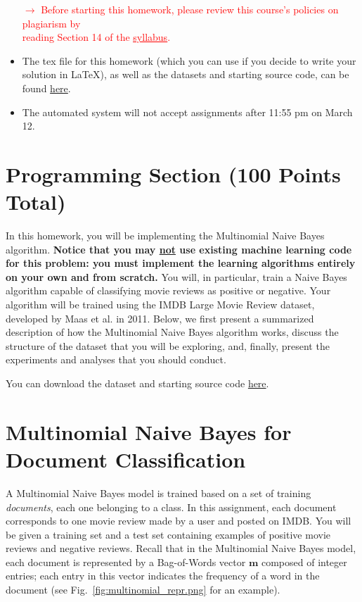 \documentclass[letterpaper]{article}
\begin{document}
\begin{itemize}
\begin{center}
    \textcolor{red}{$\rightarrow$ Before starting this homework, please review this course's policies on plagiarism by  \\reading Section 14 of the \href{https://people.cs.umass.edu/~bsilva/courses/CMPSCI_589/Spring2024/S24_589_Syllabus_v2.0.pdf\#page=5}{\textcolor{red}{\underline{syllabus}}}.}
    \end{center}
    
    \item The tex file for this homework (which you can use if you decide to write your solution in \LaTeX), as well as the datasets and starting source code, can be found \href{https://people.cs.umass.edu/~bsilva/courses/CMPSCI_589/Spring2024/homeworks/hw2.zip}{here}.
    \item The automated system will not accept assignments after 11:55 pm on March 12. 
\end{itemize}

\newpage

\vspace{1cm}
\section*{Programming Section (100 Points Total)}

In this homework, you will be implementing the Multinomial Naive Bayes algorithm. \textbf{Notice that you may \ul{not} use existing machine learning code for this problem: you must implement the learning algorithms entirely on your own and from scratch.} 
%
You will, in particular, train a Naive Bayes algorithm capable of classifying movie reviews as positive or negative. Your algorithm will be trained using the IMDB Large Movie Review dataset, developed by Maas et al. in 2011. Below, we first present a summarized description of how the Multinomial Naive Bayes algorithm works, discuss the structure of the dataset that you will be exploring, and, finally, present the experiments and analyses that you should conduct.

\noindent You can download the dataset and starting source code  \href{https://people.cs.umass.edu/~bsilva/courses/CMPSCI_589/Spring2024/homeworks/hw2.zip}{here}.

\section{Multinomial Naive Bayes for Document Classification}

A Multinomial Naive Bayes model is trained based on a set of training \textit{documents}, each one belonging to a class. In this assignment, each document corresponds to one movie review made by a user and posted on IMDB. You will be given a training set and a test set containing examples of positive movie reviews and negative reviews. Recall that in the Multinomial Naive Bayes model, each document is represented by a Bag-of-Words vector $\mathbf{m}$ composed of integer entries; each entry in this vector indicates the frequency of a word in the document (see Fig.~\ref{fig:multinomial_repr.png} for an example).
\end{document}
